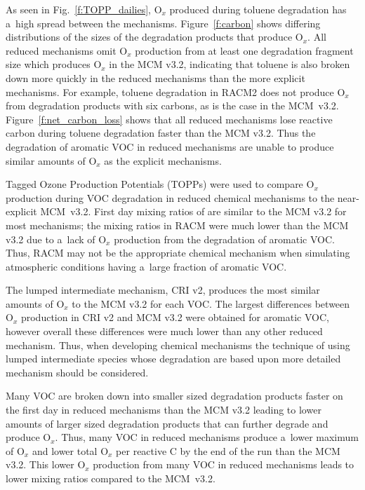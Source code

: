 \documentclass[acpd, online, hvmath]{copernicus}
\begin{document}
As seen in Fig.~\ref{f:TOPP_dailies}, O$_{x}$ produced during
toluene degradation has a~high spread between the mechanisms.
Figure~\ref{f:carbon} shows differing distributions of the sizes of
the degradation products that produce O$_{x}$.  All reduced
mechanisms omit O$_{x}$ production from at least one degradation
fragment size which produces O$_{x}$ in the MCM v3.2, indicating
that toluene is also broken down more quickly in the reduced
mechanisms than the more explicit mechanisms.  For example, toluene
degradation in RACM2 does not produce O$_{x}$ from degradation
products with six carbons, as is the case in the MCM~v3.2.
Figure~\ref{f:net_carbon_loss} shows that all reduced mechanisms lose
reactive carbon during toluene degradation faster than the MCM v3.2.
Thus the degradation of aromatic VOC in reduced mechanisms are unable
to produce similar amounts of O$_{x}$ as the explicit mechanisms.



\conclusions

Tagged Ozone Production Potentials (TOPPs) were used to compare
O$_{x}$ production during VOC degradation in reduced chemical
mechanisms to the near-explicit MCM~v3.2.  First day mixing ratios of
 are similar to the MCM v3.2 for most mechanisms; the
 mixing ratios in RACM were much lower than the MCM v3.2 due
to a~lack of O$_{x}$ production from the degradation of aromatic
VOC.  Thus, RACM may not be the appropriate chemical mechanism when
simulating atmospheric conditions having a~large fraction of aromatic
VOC.

The lumped intermediate mechanism, CRI v2, produces the most similar
amounts of O$_{x}$ to the MCM v3.2 for each VOC.  The largest
differences between O$_{x}$ production in CRI v2 and MCM v3.2 were
obtained for aromatic VOC, however overall these differences were much
lower than any other reduced mechanism.  Thus, when developing
chemical mechanisms the technique of using lumped intermediate species
whose degradation are based upon more detailed mechanism should be
considered.

Many VOC are broken down into smaller sized degradation products
faster on the first day in reduced mechanisms than the MCM v3.2
leading to lower amounts of larger sized degradation products that can
further degrade and produce O$_{x}$.  Thus, many VOC in reduced
mechanisms produce a~lower maximum of O$_{x}$ and lower total
O$_{x}$ per reactive C by the end of the run than the MCM v3.2.
This lower O$_{x}$ production from many VOC in reduced mechanisms
leads to lower  mixing ratios compared to the MCM~v3.2.
\end{document}
